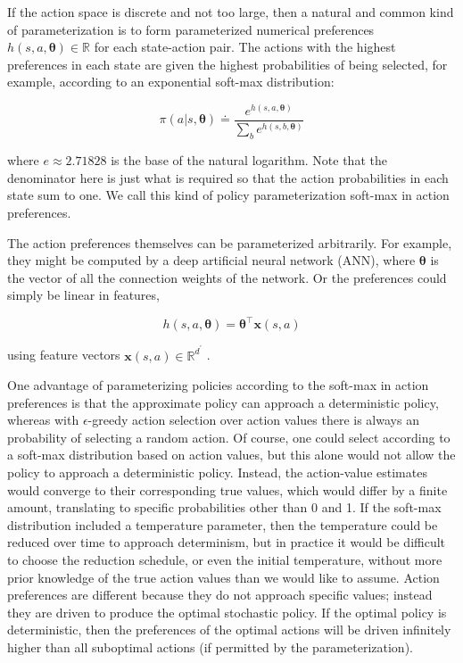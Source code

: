 \documentclass{article}
\begin{document}
If the action space is discrete and not too large, then a natural and common kind of parameterization is to form parameterized numerical preferences $h ( s , a , \pmb { \theta } ) \in \mathbb { R }$ for each state-action pair. 
The actions with the highest preferences in each state are given the highest probabilities of being selected, for example, according to an exponential soft-max distribution:

$$
\pi ( a | s , \pmb { \theta } ) \doteq \frac { e ^ { h ( s , a , \pmb { \theta } ) } } { \sum _ { b } e ^ { h ( s , b , \pmb { \theta } ) } }
$$

where $e \approx 2 . 7 1 8 2 8$ is the base of the natural logarithm. Note that the denominator here is just what is required so that the action probabilities in each state sum to one. 
We call this kind of policy parameterization soft-max in action preferences.

The action preferences themselves can be parameterized arbitrarily. For example, they might be computed by a deep artificial neural network (ANN), where $\pmb { \theta }$ is the vector of all the connection weights of the network. Or the preferences could simply be linear in features,

$$
h ( s , a , \pmb { \theta } ) = \pmb { \theta } ^ { \top } \mathbf { x } ( s , a )
$$

using feature vectors $\mathbf { x } ( s , a ) \in \mathbb { R } ^ { d ^ { \prime } }$ .

One advantage of parameterizing policies according to the soft-max in action preferences is that the approximate policy can approach a deterministic policy, whereas with $\epsilon$-greedy action selection over action values there is always an 
probability of selecting a random action. Of course, one could select according to a soft-max distribution based on action values, but this alone would not allow the policy to approach a deterministic policy. Instead, the action-value estimates 
would converge to their corresponding true values, which would differ by a finite amount, translating to specific probabilities other than 0 and 1. If the soft-max distribution included a temperature parameter, then the temperature could be reduced over time to approach determinism, 
but in practice it would be difficult to choose the reduction schedule, or even the initial temperature, without more prior knowledge of the true action values than we would like to assume. Action preferences are different because they do not approach specific values; 
instead they are driven to produce the optimal stochastic policy. If the optimal policy is deterministic, then the preferences of the optimal actions will be driven infinitely higher than all suboptimal actions (if permitted by the parameterization).
\end{document}
